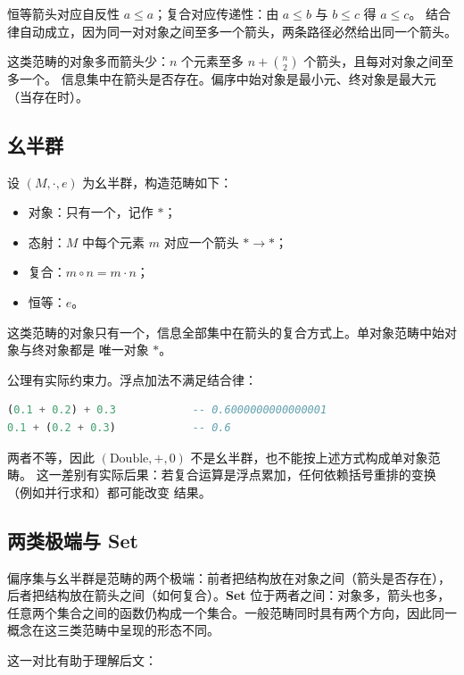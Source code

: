 恒等箭头对应自反性 \(a \leq a\)；复合对应传递性：由 \(a \leq b\) 与 \(b \leq c\) 得 \(a \leq c\)。
结合律自动成立，因为同一对对象之间至多一个箭头，两条路径必然给出同一个箭头。

这类范畴的对象多而箭头少：\(n\) 个元素至多 \(n + \binom{n}{2}\) 个箭头，且每对对象之间至多一个。
信息集中在箭头是否存在。偏序中始对象是最小元、终对象是最大元（当存在时）。

\subsection{幺半群}\label{ux5e7aux534aux7fa4}

设 \((M, \cdot, e)\) 为幺半群，构造范畴如下：

\begin{itemize}
\tightlist
\item
  对象：只有一个，记作 \(\ast\)；
\item
  态射：\(M\) 中每个元素 \(m\) 对应一个箭头 \(\ast \to \ast\)；
\item
  复合：\(m \circ n = m \cdot n\)；
\item
  恒等：\(e\)。
\end{itemize}

这类范畴的对象只有一个，信息全部集中在箭头的复合方式上。单对象范畴中始对象与终对象都是
唯一对象 \(\ast\)。

公理有实际约束力。浮点加法不满足结合律：

\begin{lstlisting}[language=Haskell]
(0.1 + 0.2) + 0.3            -- 0.6000000000000001
0.1 + (0.2 + 0.3)            -- 0.6
\end{lstlisting}

两者不等，因此 \((\mathrm{Double}, +, 0)\) 不是幺半群，也不能按上述方式构成单对象范畴。
这一差别有实际后果：若复合运算是浮点累加，任何依赖括号重排的变换（例如并行求和）都可能改变
结果。

\subsection{\texorpdfstring{两类极端与 \textbf{Set}}{两类极端与 Set}}\label{ux4e24ux7c7bux6781ux7aefux4e0e-set}

偏序集与幺半群是范畴的两个极端：前者把结构放在对象之间（箭头是否存在），后者把结构放在箭头之间（如何复合）。\textbf{Set} 位于两者之间：对象多，箭头也多，任意两个集合之间的函数仍构成一个集合。一般范畴同时具有两个方向，因此同一概念在这三类范畴中呈现的形态不同。

这一对比有助于理解后文：

